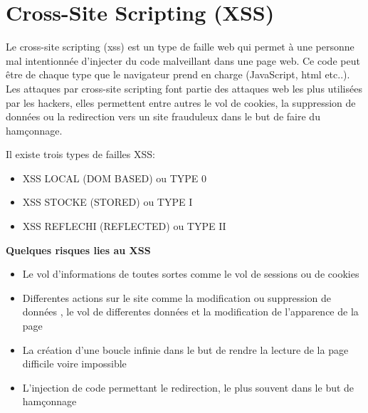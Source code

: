

\newpage
\section{Cross-Site Scripting (XSS)}\label{vulnerabilites:web:xss}

Le cross-site scripting (xss) est un type de faille web qui permet à une personne mal intentionnée d'injecter du code malveillant dans une page web. Ce code peut être de chaque type que le navigateur prend en charge (JavaScript, html etc..). Les attaques par cross-site scripting font partie des attaques web les plus utilisées par les hackers, elles permettent entre autres le vol de cookies, la suppression de données ou la redirection vers un site frauduleux dans le but de faire du hamçonnage.

\bigskip

\begin{flushleft}
Il existe trois types de failles XSS:
\end{flushleft}
\begin{itemize}
\item XSS LOCAL (DOM BASED) ou TYPE 0
\item XSS STOCKE (STORED) ou TYPE I
\item XSS REFLECHI (REFLECTED) ou TYPE II
\end{itemize}

\bigskip

\begin{flushleft}
\textbf{Quelques risques lies au XSS}
\end{flushleft}

\smallskip

\begin{itemize}
\item Le vol d'informations de toutes sortes comme le vol de sessions ou de cookies
\item Differentes actions sur le site comme la modification ou suppression de données , le vol de differentes données et la modification de l'apparence de la page
\item La création d'une boucle infinie dans le but de rendre la lecture de la page difficile voire impossible
\item L'injection de code permettant le redirection, le plus souvent dans le but de hamçonnage
\end{itemize}


